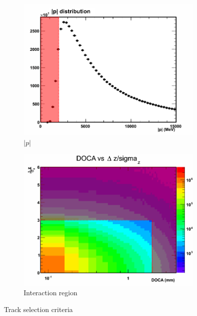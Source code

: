 \begin{figure}[h]
\begin{subfigure}[h]{0.49\textwidth}
		\includegraphics[width=\textwidth]{./Chapters/multiplicity/images/track_selection_p.png}
		\caption{$|p|$}
		\label{fig: track selection criteria p}
	\end{subfigure}
	\begin{subfigure}[h]{0.49\textwidth}
		\includegraphics[width=\textwidth]{./Chapters/multiplicity/images/track_selection_ir.png}
		\caption{Interaction region}
		\label{fig: track selection criteria ir}
	\end{subfigure}
	\caption{Track selection criteria}
	\label{fig: track selection criteria}
\end{figure}